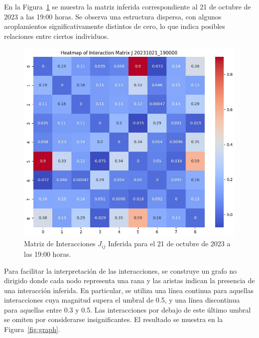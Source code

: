 \documentclass[a4paper,10pt,twocolumn]{article}
\begin{document}
En la Figura~\ref{fig:jij} se muestra 
la matriz inferida correspondiente al 21 de octubre de 2023 a 
las 19:00 horas. Se observa una estructura dispersa, 
con algunos acoplamientos significativamente distintos de cero, 
lo que indica posibles relaciones entre ciertos 
individuos.

\begin{figure}[htbp]
    \centering
    \includegraphics[width=\columnwidth]{assets/matrix_jij.jpg}
    \caption{Matriz de Interacciones \( J_{ij} \) Inferida para el 21 de octubre de 2023 a las 19:00 horas.}
    \label{fig:jij}
\end{figure}

Para facilitar la interpretación de las interacciones, se 
construye un grafo no dirigido donde cada nodo representa una 
rana y las aristas indican la presencia de una interacción 
inferida. En particular, se utiliza una línea continua para 
aquellas interacciones cuya magnitud supera el umbral de 0.5, 
y una línea discontinua para aquellas entre 0.3 y 0.5. 
Las interacciones por debajo de este último umbral se omiten 
por considerarse insignificantes. El resultado se muestra en la 
Figura~\ref{fig:graph}.
\end{document}
